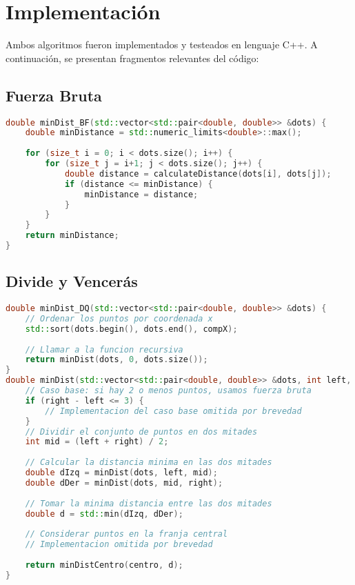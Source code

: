 \documentclass{article}
\begin{document}
  
\section{Implementación}

Ambos algoritmos fueron implementados y testeados en lenguaje C++. A continuación, se presentan fragmentos relevantes del código:

\subsection{Fuerza Bruta}

\begin{lstlisting}[language=C++]
double minDist_BF(std::vector<std::pair<double, double>> &dots) {
    double minDistance = std::numeric_limits<double>::max();
    
    for (size_t i = 0; i < dots.size(); i++) {
        for (size_t j = i+1; j < dots.size(); j++) {
            double distance = calculateDistance(dots[i], dots[j]);
            if (distance <= minDistance) {
                minDistance = distance;
            }
        }
    }
    return minDistance;
}
\end{lstlisting}

\subsection{Divide y Vencerás}

\begin{lstlisting}[language=C++]
double minDist_DQ(std::vector<std::pair<double, double>> &dots) {
    // Ordenar los puntos por coordenada x
    std::sort(dots.begin(), dots.end(), compX);
    
    // Llamar a la funcion recursiva
    return minDist(dots, 0, dots.size());
}
double minDist(std::vector<std::pair<double, double>> &dots, int left, int right) {
    // Caso base: si hay 2 o menos puntos, usamos fuerza bruta
    if (right - left <= 3) {
        // Implementacion del caso base omitida por brevedad
    }   
    // Dividir el conjunto de puntos en dos mitades
    int mid = (left + right) / 2;
    
    // Calcular la distancia minima en las dos mitades
    double dIzq = minDist(dots, left, mid);
    double dDer = minDist(dots, mid, right);
    
    // Tomar la minima distancia entre las dos mitades
    double d = std::min(dIzq, dDer);
    
    // Considerar puntos en la franja central
    // Implementacion omitida por brevedad
    
    return minDistCentro(centro, d);
}
\end{lstlisting}
  
\end{document}
